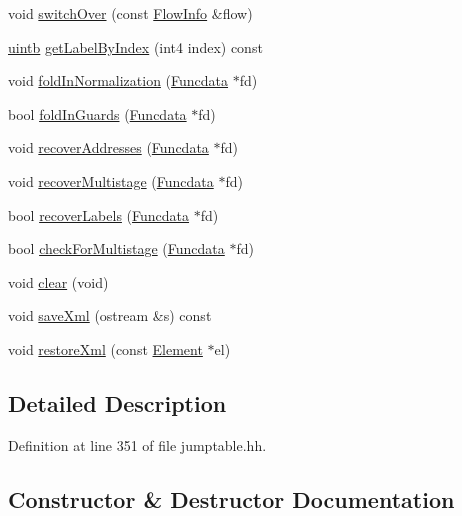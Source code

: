 \begin{DoxyCompactItemize}
void \mbox{\hyperlink{class_jump_table_a421a6817e059ff862b9e057701da8f01}{switch\+Over}} (const \mbox{\hyperlink{class_flow_info}{Flow\+Info}} \&flow)
\item 
\mbox{\hyperlink{types_8h_a2db313c5d32a12b01d26ac9b3bca178f}{uintb}} \mbox{\hyperlink{class_jump_table_ac0524721754a4e17fcccd2e66278c65c}{get\+Label\+By\+Index}} (int4 index) const
\item 
void \mbox{\hyperlink{class_jump_table_adce4756430ff5677d7acbe42ffe28775}{fold\+In\+Normalization}} (\mbox{\hyperlink{class_funcdata}{Funcdata}} $\ast$fd)
\item 
bool \mbox{\hyperlink{class_jump_table_a93527eafa438cf24fb5ee796e7bb1ba6}{fold\+In\+Guards}} (\mbox{\hyperlink{class_funcdata}{Funcdata}} $\ast$fd)
\item 
void \mbox{\hyperlink{class_jump_table_a98aaa32e26ede9547d5979cab872322c}{recover\+Addresses}} (\mbox{\hyperlink{class_funcdata}{Funcdata}} $\ast$fd)
\item 
void \mbox{\hyperlink{class_jump_table_afba6e59f39d15b0f5b231ef9d849625e}{recover\+Multistage}} (\mbox{\hyperlink{class_funcdata}{Funcdata}} $\ast$fd)
\item 
bool \mbox{\hyperlink{class_jump_table_aa104a5da577eb8a1a5ab9aa30bbc7210}{recover\+Labels}} (\mbox{\hyperlink{class_funcdata}{Funcdata}} $\ast$fd)
\item 
bool \mbox{\hyperlink{class_jump_table_a738bcb6e673e65e1d054d102da1cbdc5}{check\+For\+Multistage}} (\mbox{\hyperlink{class_funcdata}{Funcdata}} $\ast$fd)
\item 
void \mbox{\hyperlink{class_jump_table_a99d3224b0c24b9ef1140f86fe372879d}{clear}} (void)
\item 
void \mbox{\hyperlink{class_jump_table_a314231b6a4d240c21de28f39fd0a8b57}{save\+Xml}} (ostream \&s) const
\item 
void \mbox{\hyperlink{class_jump_table_a6c61097c622f85e04db056d9613e94f1}{restore\+Xml}} (const \mbox{\hyperlink{class_element}{Element}} $\ast$el)
\end{DoxyCompactItemize}


\subsection{Detailed Description}


Definition at line 351 of file jumptable.\+hh.



\subsection{Constructor \& Destructor Documentation}
\mbox{\label{class_jump_table_a319075559bee7b7d3ae6b0485965a14e}} 
